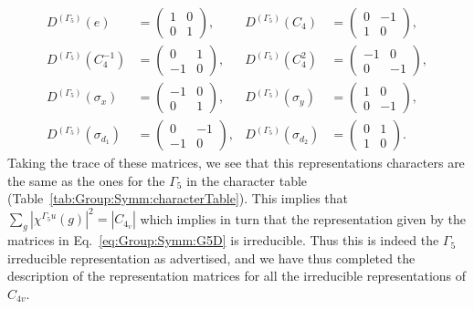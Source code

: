 \begin{subequations}
    \label{eq:Group:Symm:G5D}
\begin{align}
    D^{(\Gamma_5)}(e) &=
    \begin{pmatrix}
        1 & 0\\
        0 & 1
    \end{pmatrix}, & D^{(\Gamma_5)}(C_4) &=
    \begin{pmatrix}
        0 & -1\\
        1 & 0
    \end{pmatrix},\\
    D^{(\Gamma_5)}(C_4^{-1}) &=
    \begin{pmatrix}
        0 & 1\\
        -1 & 0
    \end{pmatrix}, & D^{(\Gamma_5)}(C_4^2) &= 
    \begin{pmatrix}
        -1 & 0\\
        0 & -1
    \end{pmatrix},\\
    D^{(\Gamma_5)}(\sigma_x) &= 
    \begin{pmatrix}
        -1 & 0\\
        0 & 1
    \end{pmatrix}, & D^{(\Gamma_5)}(\sigma_y) &=
    \begin{pmatrix}
        1 & 0\\
        0 & -1
    \end{pmatrix},\\
    D^{(\Gamma_5)}(\sigma_{d_1}) &=
    \begin{pmatrix}
        0 & -1\\
        -1 & 0
    \end{pmatrix}, & D^{(\Gamma_5)}(\sigma_{d_2}) &=
    \begin{pmatrix}
        0 & 1\\
        1 & 0
    \end{pmatrix}.
\end{align}
\end{subequations}
Taking the trace of these matrices, we see that this representations characters are the same as the ones for the \irr $\Gamma_5$ in the character table
(Table~\ref{tab:Group:Symm:characterTable}). This implies that $\sum_g|\chi^{\Gamma_5u}(g)|^2 = |C_{4_v}|$ which implies in turn that the representation
given by the matrices in Eq.~\eqref{eq:Group:Symm:G5D} is irreducible. Thus this is indeed the $\Gamma_5$ irreducible representation as advertised,
and we have thus completed the description of the representation matrices for all the irreducible representations of $C_{4v}$.


